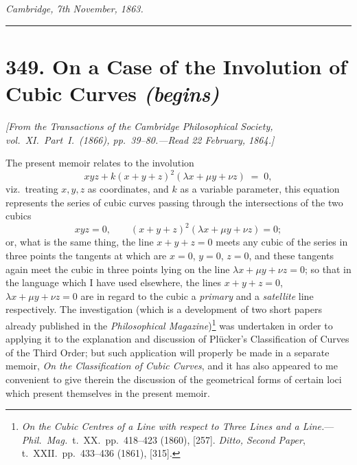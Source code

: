 \documentclass[11pt,a4paper]{article}
\begin{document}
\medskip

\noindent\textit{Cambridge, 7th November, 1863.}

\bigskip
\noindent\rule{\textwidth}{0.4pt}
\bigskip

\section*{349. On a Case of the Involution of Cubic Curves \textit{(begins)}}

\noindent\textit{[From the Transactions of the Cambridge Philosophical Society, vol.~XI.\ Part~I.\ (1866), pp.~39--80.---Read 22 February, 1864.]}

\medskip

The present memoir relates to the involution
\[
xyz + k(x + y + z)^2 (\lambda x + \mu y + \nu z) \;=\; 0,
\]
viz.\ treating $x, y, z$ as coordinates, and $k$ as a variable parameter, this equation represents the series of cubic curves passing through the intersections of the two cubics
\[
xyz = 0,\qquad (x + y + z)^2(\lambda x + \mu y + \nu z) = 0;
\]
or, what is the same thing, the line $x + y + z = 0$ meets any cubic of the series in three points the tangents at which are $x = 0$, $y = 0$, $z = 0$, and these tangents again meet the cubic in three points lying on the line $\lambda x + \mu y + \nu z = 0$; so that in the language which I have used elsewhere, the lines $x + y + z = 0$, $\lambda x + \mu y + \nu z = 0$ are in regard to the cubic a \emph{primary} and a \emph{satellite} line respectively. The investigation (which is a development of two short papers already published in the \textit{Philosophical Magazine})\footnote{\textit{On the Cubic Centres of a Line with respect to Three Lines and a Line.}---\textit{Phil.\ Mag.}\ t.~XX.\ pp.~418--423 (1860), [257]. \textit{Ditto, Second Paper}, t.~XXII.\ pp.~433--436 (1861), [315].} was undertaken in order to applying it to the explanation and discussion of Pl\"ucker's Classification of Curves of the Third Order; but such application will properly be made in a separate memoir, \textit{On the Classification of Cubic Curves}, and it has also appeared to me convenient to give therein the discussion of the geometrical forms of certain loci which present themselves in the present memoir.

\medskip
\end{document}
